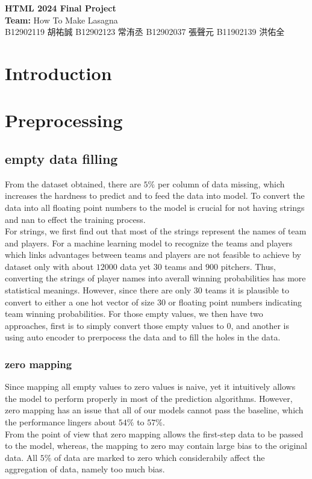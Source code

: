 \documentclass[12pt,a4paper]{article}
\begin{document}
\begin{center}
  {\LARGE \bf HTML 2024 Final Project}\\[8pt]
  \textbf{Team:} How To Make Lasagna\\
  B12902119 胡祐誠
  B12902123 常洧丞
  B12902037 張聲元
  B11902139 洪佑全
\end{center}


\section{Introduction}


\section{Preprocessing}
\subsection{empty data filling}
From the dataset obtained, there are $5\%$ per column of data missing, which increases the hardness to predict and to feed the data into model.
To convert the data into all floating point numbers to the model is crucial for not having strings and nan to effect the training process. \\
For strings, we first find out that most of the strings represent the names of team and players.
For a machine learning model to recognize the teams and players which links advantages between teams and players are not feasible to achieve by dataset only with about $12000$ data yet $30$ teams and $900$ pitchers.
Thus, converting the strings of player names into averall winning probabilities has more statistical meanings. 
However, since there are only $30$ teams it is plausible to convert to either a one hot vector of size $30$ or floating point numbers indicating team winning probabilities.
For those empty values, we then have two approaches, first is to simply convert those empty values to $0$, and another is using auto encoder to prerpocess the data and to fill the holes in the data. \\

\subsubsection{zero mapping}
Since mapping all empty values to zero values is naive, yet it intuitively allows the model to perform properly in most of the prediction algorithms.
However, zero mapping has an issue that all of our models cannot pass the baseline, which the performance lingers about $54\%$ to $57\%$. \\
From the point of view that zero mapping allows the first-step data to be passed to the model, whereas, the mapping to zero may contain large bias to the original data.
All $5\%$ of data are marked to zero which considerabily affect the aggregation of data, namely too much bias.
\end{document}
